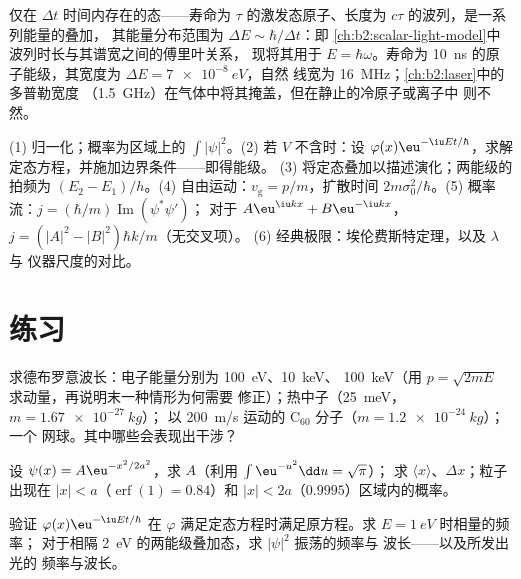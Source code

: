 \begin{remark}[能量与时间]\label{rem:b2:schrodinger-wave-functions:energytime}
仅在 $\Delta t$ 时间内存在的态——寿命为
$\tau$ 的激发态原子、长度为 $c\tau$ 的波列，是一系列能量的叠加，
其能量分布范围为 $\Delta E \sim \hbar/\Delta t$：即
\cref{ch:b2:scalar-light-model}中波列时长与其谱宽之间的傅里叶关系，
现将其用于 $E = \hbar\omega$。寿命为
\qty{10}{ns} 的原子能级，其宽度为 $\Delta E = \qty{7e-8}{eV}$，自然
线宽为 \qty{16}{MHz}；\cref{ch:b2:laser}中的多普勒宽度
（\qty{1.5}{GHz}）在气体中将其掩盖，但在静止的冷原子或离子中
则不然。
\end{remark}

\begin{method}[波函数的应用]\label{meth:b2:schrodinger-wave-functions:method}
(1) 归一化；概率为区域上的 $\int|\psi|^2$。(2)
若 $V$ 不含时：设 $\varphi(x)\eu^{-\iu Et/\hbar}$，求解
定态方程，并施加边界条件——即得能级。
(3) 将定态叠加以描述演化；两能级的拍频为
$(E_2 - E_1)/h$。(4) 自由运动：$v_{\text{g}} = p/m$，扩散时间
$2m\sigma_0^2/\hbar$。(5) 概率流：$j = (\hbar/m)\operatorname{Im}(\psi^*\psi')$；
对于 $A\eu^{\iu kx} + B\eu^{-\iu kx}$，$j = (|A|^2 - |B|^2)\hbar k/m$（无交叉项）。
(6) 经典极限：埃伦费斯特定理，以及 $\lambda$ 与
仪器尺度的对比。
\end{method}

\section{练习}

\begin{exercise}[$\star$]\label{exo:b2:schrodinger-wave-functions:1}
求德布罗意波长：电子能量分别为 \qty{100}{eV}、\qty{10}{keV}、
\qty{100}{keV}（用 $p = \sqrt{2mE}$ 求动量，再说明末一种情形为何需要
修正）；热中子（\qty{25}{meV}，$m = \qty{1.67e-27}{kg}$）；
以 \qty{200}{m/s} 运动的 C$_{60}$ 分子（$m = \qty{1.2e-24}{kg}$）；一个
网球。其中哪些会表现出干涉？
\end{exercise}

\begin{exercise}[$\star$]\label{exo:b2:schrodinger-wave-functions:2}
设 $\psi(x) = A\eu^{-x^2/2a^2}$，求 $A$（利用 $\int\eu^{-u^2}\dd u = \sqrt\pi$）；
求 $\langle x\rangle$、$\Delta x$；粒子出现在
$|x| < a$（$\operatorname{erf}(1) = 0.84$）和 $|x| < 2a$（$0.9995$）区域内的概率。
\end{exercise}

\begin{exercise}[$\star$]\label{exo:b2:schrodinger-wave-functions:3}
验证 $\varphi(x)\eu^{-\iu Et/\hbar}$ 在 $\varphi$
满足定态方程时满足原方程。求 $E = \qty{1}{eV}$ 时相量的频率；
对于相隔 \qty{2}{eV} 的两能级叠加态，求 $|\psi|^2$ 振荡的频率与
波长——以及所发出光的
频率与波长。
\end{exercise}

